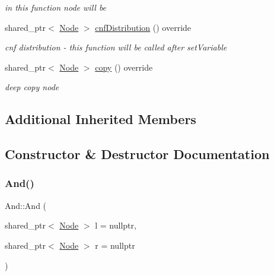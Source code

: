\begin{DoxyCompactItemize}
\begin{DoxyCompactList}\small\item\em in this function node will be \end{DoxyCompactList}\item 
shared\+\_\+ptr$<$ \hyperlink{class_node}{Node} $>$ \hyperlink{class_and_a370c86f44ee17b22208cdbc1f17a7b3f}{cnf\+Distribution} () override
\begin{DoxyCompactList}\small\item\em cnf distribution -\/ this function will be called after set\+Variable \end{DoxyCompactList}\item 
shared\+\_\+ptr$<$ \hyperlink{class_node}{Node} $>$ \hyperlink{class_and_a7560a861ae68050c2aa22e2392a46a15}{copy} () override
\begin{DoxyCompactList}\small\item\em deep copy node \end{DoxyCompactList}\end{DoxyCompactItemize}
\subsection*{Additional Inherited Members}


\subsection{Constructor \& Destructor Documentation}
\mbox{\label{class_and_a6058f4ed6168568b529e1e0750df8cf8}} 
\subsubsection{\texorpdfstring{And()}{And()}}
{\footnotesize\ttfamily And\+::\+And (\begin{DoxyParamCaption}\item[{shared\+\_\+ptr$<$ \hyperlink{class_node}{Node} $>$}]{l = {\ttfamily nullptr},  }\item[{shared\+\_\+ptr$<$ \hyperlink{class_node}{Node} $>$}]{r = {\ttfamily nullptr} }\end{DoxyParamCaption})\hspace{0.3cm}{\ttfamily [explicit]}}

\mbox{\label{class_and_af7bc87f11ac21a32c28c194f3eb94650}} 

